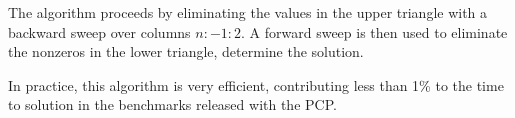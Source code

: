 The algorithm proceeds by eliminating the values in the upper triangle with a backward sweep over columns $n:-1:2$.
A forward sweep is then used to eliminate the nonzeros in the lower triangle, determine the solution.

\begin{note}
In practice, this algorithm is very efficient, contributing less than 1\% to the time to solution in the benchmarks released with the PCP. 
\end{note}


